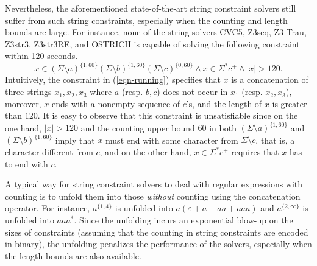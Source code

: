 Nevertheless, the aforementioned state-of-the-art string constraint solvers still suffer from such string constraints, especially when the counting and length bounds are large. For instance, none of the string solvers CVC5, Z3seq, Z3-Trau, Z3str3, Z3str3RE, and OSTRICH is capable of solving the following constraint within 120 seconds.
%
\begin{equation}\label{eqn-running}
x \in (\Sigma \setminus a)^{\{1, 60\}} (\Sigma \setminus b)^{\{1, 60\}} (\Sigma \setminus c)^{\{0, 60\}} \wedge x \in \Sigma^* c^+ \wedge |x| > 120.
\end{equation}
Intuitively, the constraint in (\ref{eqn-running}) specifies that $x$ is a concatenation of three strings $x_1, x_2, x_3$ where $a$ (resp. $b, c$) does not occur in $x_1$ (resp. $x_2, x_3$), moreover, $x$ ends with a nonempty sequence of $c$'s, and the length of $x$ is greater than $120$. It is easy to observe that this constraint is unsatisfiable since on the one hand, $|x| > 120$ and the counting upper bound $60$ in both $(\Sigma \setminus a)^{\{1, 60\}}$ and $(\Sigma \setminus b)^{\{1, 60\}}$ imply that $x$ must end with some character from $\Sigma \setminus c$, that is, a character different from $c$, and on the other hand, $x \in \Sigma^*c^+$ requires that $x$ has to end with $c$.

A typical way for string constraint solvers to deal with regular expressions with counting is to unfold them into those \emph{without} counting using the concatenation operator. For instance, $a^{\{1, 4\}}$ is unfolded into $a(\varepsilon + a + aa + aaa)$ and $a^{\{2,\infty\}}$ is unfolded into $aaa^{*}$. Since the unfolding incurs an exponential blow-up on the sizes of constraints (assuming that the counting in string constraints are encoded in binary), the unfolding penalizes the performance of the solvers, especially when the length bounds are also available.


